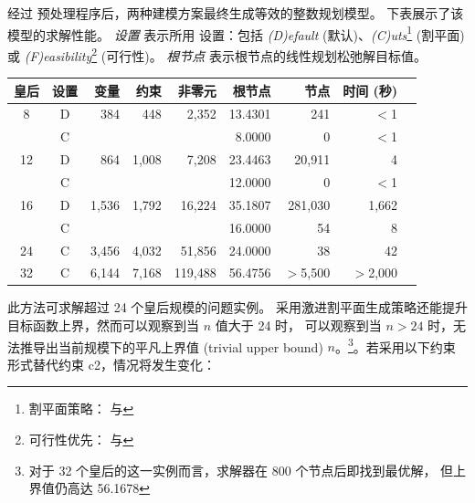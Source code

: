\medskip
\noindent 经过 \cplex 预处理程序后，两种建模方案最终生成等效的整数规划模型。
下表展示了该模型的求解性能。
\emph{设置} 表示所用 \cplex 设置：包括
\emph{(D)efault} (默认)、\emph{(C)uts}\footnote{
   割平面策略： 与 } (割平面)
或 \emph{(F)easibility}\footnote{
   可行性优先： 与 } (可行性)。
\emph{根节点} 表示根节点的线性规划松弛解目标值。
\begin{center}
{\sffamily\small
\begin{tabular}{ccrrrrrrr}
\toprule
皇后 & 设置 & 变量 &  约束 &  非零元 &  根节点 &    节点 & 时间 (秒)\\
\midrule
   8   & D &   384 &   448 &   2,352 & 13.4301 &     241 & $<$1\\
       & C &       &       &         &  8.0000 &       0 & $<$1\\
  12   & D &   864 & 1,008 &   7,208 & 23.4463 &  20,911 & 4\\
       & C &       &       &         & 12.0000 &       0 & $<$1\\
  16   & D & 1,536 & 1,792 &  16,224 & 35.1807 & 281,030 & 1,662\\
       & C &       &       &         & 16.0000 &      54 & 8\\
  24   & C & 3,456 & 4,032 &  51,856 & 24.0000 &      38 & 42\\
  32   & C & 6,144 & 7,168 & 119,488 & 56.4756 & $>$5,500& $>$2,000\\
\bottomrule
\end{tabular}
}
\end{center}
此方法可求解超过 24 个皇后规模的问题实例。
采用激进割平面生成策略还能提升目标函数上界，然而可以观察到当 $n$ 值大于 24 时，
可以观察到当 $n > 24$ 时，\cplex 无法推导出当前规模下的平凡上界值 (trivial
upper bound) $n$。\footnote{
  对于 32 个皇后的这一实例而言，求解器在 800 个节点后即找到最优解，
  但上界值仍高达 56.1678}。若采用以下约束形式替代约束 c2，情况将发生变化：

